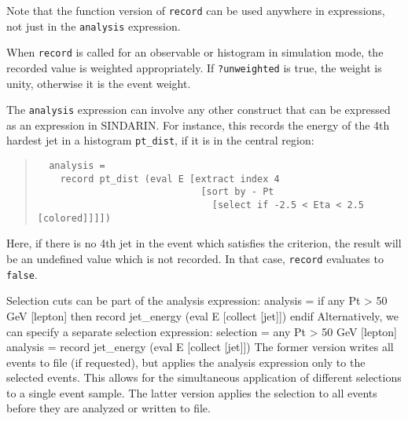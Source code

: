 \documentclass[12pt]{book}
\newenvironment{code}%
  {\begingroup\footnotesize
   \quote
   \verbatim}%
  {\endverbatim
   \endquote
   \endgroup\noindent}
\newcommand{\ttt}[1]{\texttt{#1}}
\begin{document}
Note that the function version of \ttt{record} can be used anywhere in
expressions, not just in the \ttt{analysis} expression.

When \ttt{record} is called for an observable or histogram in simulation mode,
the recorded value is weighted appropriately.  If \ttt{?unweighted} is true,
the weight is unity, otherwise it is the event weight.

The \ttt{analysis} expression can involve any other construct
that can be expressed as an expression in SINDARIN.  For instance, this
records the energy of the 4th hardest jet in a histogram \ttt{pt\_dist}, if it
is in the central region:
\begin{quote}
  \begin{footnotesize}
\begin{verbatim}
  analysis = 
    record pt_dist (eval E [extract index 4 
                             [sort by - Pt 
                               [select if -2.5 < Eta < 2.5 [colored]]]])
\end{verbatim}
  \end{footnotesize}
\end{quote}
Here, if there is no 4th jet in the event which satisfies the criterion, the
result will be an undefined value which is not recorded.  In that case,
\ttt{record} evaluates to \ttt{false}.

Selection cuts can be part of the analysis expression:
\begin{code}
  analysis =
    if any Pt > 50 GeV [lepton] then
      record jet_energy (eval E [collect [jet]])
    endif
\end{code}
Alternatively, we can specify a separate selection expression:
\begin{code}
  selection = any Pt > 50 GeV [lepton]
  analysis = record jet_energy (eval E [collect [jet]])
\end{code}
The former version writes all events to file (if requested), but
applies the analysis expression only to the selected events.  This
allows for the simultaneous application of different selections to a
single event sample.  The latter version applies the selection to all
events before they are analyzed or written to file.
\end{document}

